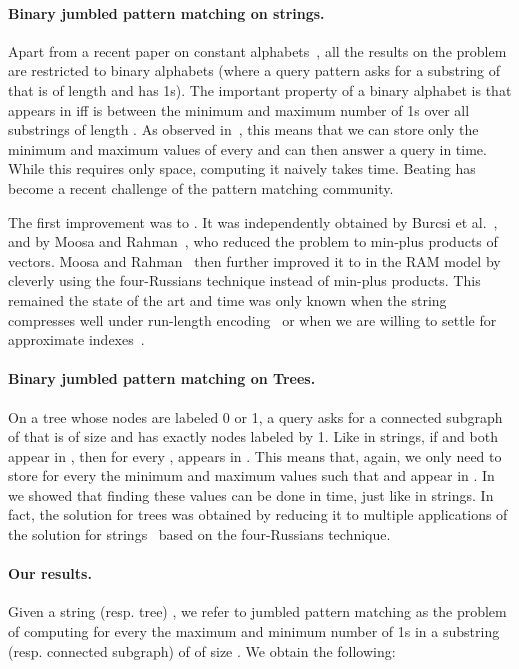 \documentclass[11pt]{llncs}
\begin{document}
\paragraph{\bf Binary jumbled pattern matching on strings.}
Apart from a recent paper on constant alphabets~\cite{ESA13}, all the
 results on the problem are restricted to binary alphabets (where a query pattern  asks for a substring of  that is of length  and has  1s). The important property of a binary alphabet is that  appears in  iff  is between the minimum and maximum number of 1s over all substrings of length .
As observed in~\cite{CFL09}, this means that we can store only the  minimum and maximum values of every  and can then answer a query in  time. While this requires only  space, computing it naively takes  time. Beating  has become a recent challenge of the pattern matching community.

The first improvement was to . It was independently obtained by Burcsi et al.~\cite{BCFL12a}, and by Moosa and Rahman~\cite{MR10}, who reduced the problem to min-plus products of vectors. Moosa and Rahman~\cite{MR12} then further improved it to  in the RAM model by cleverly using the four-Russians technique instead of min-plus products. This remained the state of the art and  time was only known when the string compresses well under run-length encoding~\cite{BFKL12,GG12} or when we are willing to settle for approximate indexes~\cite{CLWY12}.

 \paragraph{\bf Binary jumbled pattern matching on Trees.}
On a tree  whose nodes are labeled 0 or 1, a query  asks for a connected subgraph of  that is of size  and has exactly  nodes labeled by 1. Like in strings, if  and  both appear in , then for every ,   appears in . This means that, again, we only need to store for every  the minimum  and maximum  values such that   and  appear  in .
In~\cite{OurESA13} we showed that finding these values can be done in  time, just like in strings.  In fact, the solution for trees was obtained by reducing it to multiple applications of the solution for strings~\cite{MR12} based on the four-Russians technique.

\paragraph{\bf Our results.} Given a string (resp. tree) , we refer to jumbled pattern matching as the problem of computing for every  the maximum and minimum number of 1s in a substring (resp. connected subgraph) of  of size .
We obtain the following:
\end{document}
